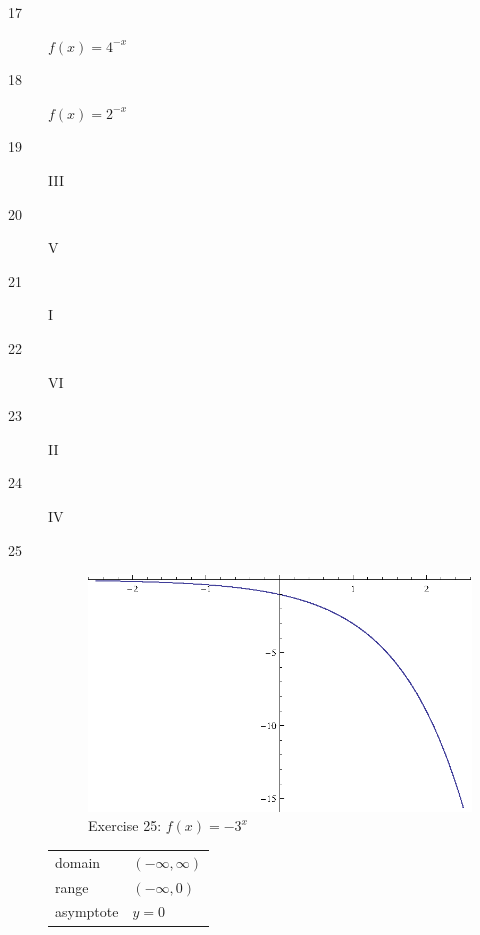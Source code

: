 \documentclass{exam}
\begin{document}
\begin{description}
      \item[17] $f(x) = 4^{-x}$

      \item[18] $f(x) = 2^{-x}$

      \item[19] III

      \item[20] V

      \item[21] I

      \item[22] VI

      \item[23] II

      \item[24] IV

      \item[25] 
        \begin{figure}[H]
          \centering
          \includegraphics[scale=0.9]{exercise25.eps}
          \caption*{Exercise 25: $f(x) = -3^x$}
        \end{figure}

        \begin{tabular}[H]{ll}
          \toprule
          domain    & $(-\infty, \infty)$ \\
          range     & $(-\infty, 0)$ \\
          asymptote & $y = 0$ \\
          \bottomrule
        \end{tabular}


\end{description}
\end{document}
